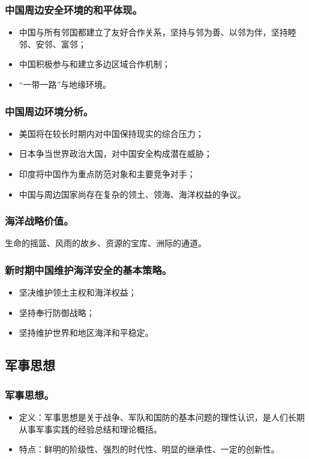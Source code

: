 \documentclass{article}
\begin{document}
\subsubsection{中国周边安全环境的和平体现。}
\begin{itemize}
    \item 中国与所有邻国都建立了友好合作关系，坚持与邻为善、以邻为伴，坚持睦邻、安邻、富邻；
    \item 中国积极参与和建立多边区域合作机制；
    \item “一带一路”与地缘环境。
\end{itemize}

\subsubsection{中国周边环境分析。}
\begin{itemize}
    \item 美国将在较长时期内对中国保持现实的综合压力；
    \item 日本争当世界政治大国，对中国安全构成潜在威胁；
    \item 印度将中国作为重点防范对象和主要竞争对手；
    \item 中国与周边国家尚存在复杂的领土、领海、海洋权益的争议。
\end{itemize}

\subsubsection{海洋战略价值。}
生命的摇篮、风雨的故乡、资源的宝库、洲际的通道。

\subsubsection{新时期中国维护海洋安全的基本策略。}
\begin{itemize}
    \item 坚决维护领土主权和海洋权益；
    \item 坚持奉行防御战略；
    \item 坚持维护世界和地区海洋和平稳定。
\end{itemize}

\subsection{军事思想}

\subsubsection{军事思想。}
\begin{itemize}
    \item 定义：军事思想是关于战争、军队和国防的基本问题的理性认识，是人们长期从事军事实践的经验总结和理论概括。
    \item 特点：鲜明的阶级性、强烈的时代性、明显的继承性、一定的创新性。
\end{itemize}
\end{document}
